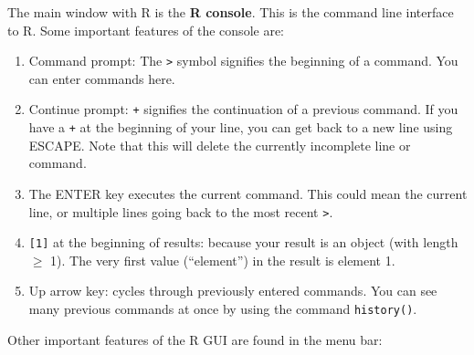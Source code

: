 \documentclass[
  13,
  letterpaper,
]{report}
\begin{document}
The main window with R is the \textbf{R console}. This is the command
line interface to R. Some important features of the console are:

\begin{enumerate}
\def\labelenumi{\arabic{enumi}.}
\item
  Command prompt: The \texttt{\textgreater{}} symbol signifies the
  beginning of a command. You can enter commands here.
\item
  Continue prompt: \texttt{+} signifies the continuation of a previous
  command. If you have a \texttt{+} at the beginning of your line, you
  can get back to a new line using ESCAPE. Note that this will delete
  the currently incomplete line or command.
\item
  The ENTER key executes the current command. This could mean the
  current line, or multiple lines going back to the most recent
  \texttt{\textgreater{}}.
\item
  \texttt{{[}1{]}} at the beginning of results: because your result is
  an object (with length \(\ge\) 1). The very first value (``element'')
  in the result is element 1.
\item
  Up arrow key: cycles through previously entered commands. You can see
  many previous commands at once by using the command
  \texttt{history()}.
\end{enumerate}

Other important features of the R GUI are found in the menu bar:
\end{document}
